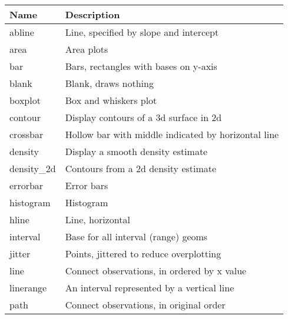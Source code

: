\begin{table}
  \begin{center}
  \begin{tabular}{lp{3in}}
      \toprule
      Name & Description \\
      \midrule
      abline       & Line, specified by slope and intercept                                       \\
      area         & Area plots                                                                   \\
      bar          & Bars, rectangles with bases on y-axis                                        \\
      blank        & Blank, draws nothing                                                         \\
      boxplot      & Box and whiskers plot                                                        \\
      contour      & Display contours of a 3d surface in 2d                                       \\
      crossbar     & Hollow bar with middle indicated by horizontal line                          \\
      density      & Display a smooth density estimate                                            \\
      density\_2d & Contours from a 2d density estimate                                          \\
      errorbar     & Error bars                                                                   \\
      histogram    & Histogram                                                                    \\
      hline        & Line, horizontal                                                             \\
      interval     & Base for all interval (range) geoms                                          \\
      jitter       & Points, jittered to reduce overplotting                                      \\
      line         & Connect observations, in ordered by x value                                  \\
      linerange    & An interval represented by a vertical line                                   \\
      path         & Connect observations, in original order                                      \\

\end{tabular}
\end{center}
\end{table}
